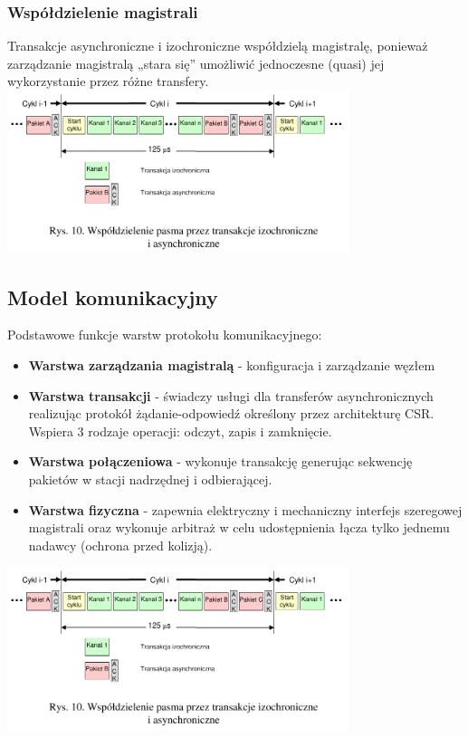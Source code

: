 \subsubsection{Współdzielenie magistrali}
Transakcje asynchroniczne i izochroniczne współdzielą magistralę, ponieważ zarządzanie magistralą „stara się” umożliwić jednoczesne (quasi) jej wykorzystanie przez różne transfery.\\
\includegraphics[width=10cm]{./wyklady/FIREWIRE_13_1.pdf}\\

\subsection{Model komunikacyjny}
Podstawowe funkcje warstw protokołu komunikacyjnego:
\begin{itemize}
	\item \textbf{Warstwa zarządzania magistralą} - konfiguracja i zarządzanie węzłem
	\item \textbf{Warstwa transakcji} - świadczy usługi dla transferów asynchronicznych realizując protokół żądanie-odpowiedź określony przez architekturę CSR. Wspiera 3 rodzaje operacji: odczyt, zapis i zamknięcie.
	\item \textbf{Warstwa połączeniowa} - wykonuje transakcję generując sekwencję pakietów w stacji nadrzędnej i odbierającej.
	\item \textbf{Warstwa fizyczna} - zapewnia elektryczny i mechaniczny interfejs szeregowej magistrali oraz wykonuje arbitraż w celu udostępnienia łącza tylko jednemu nadawcy (ochrona przed kolizją).
\end{itemize}
\includegraphics[width=10cm]{./wyklady/FIREWIRE_13_1.pdf}

